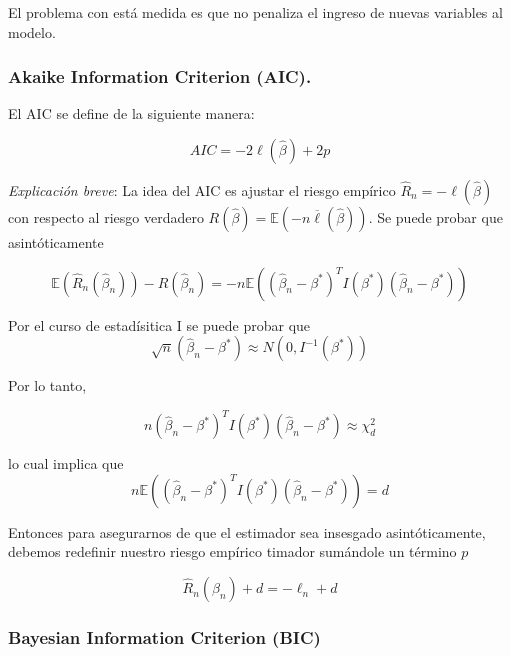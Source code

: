 \documentclass[
  12pt,
]{book}
\theoremstyle{definition}
\theoremstyle{definition}
\theoremstyle{definition}
\theoremstyle{definition}
\theoremstyle{remark}
\begin{document}
El problema con está medida es que no penaliza el ingreso de nuevas variables al modelo.

\hypertarget{akaike-information-criterion-aic.-1}{%
\subsubsection{Akaike Information Criterion (AIC).}\label{akaike-information-criterion-aic.-1}}

El AIC se define de la siguiente manera:

\[
AIC = -2\ell(\hat{\beta}) + 2p 
\]

\emph{Explicación breve}: La idea del AIC es ajustar el riesgo empírico \(\hat{R}_n = -\ell(\hat{\beta})\) con respecto al riesgo verdadero \(R(\hat{\beta}) = \mathbb{E}(-n\overline{\ell}(\hat{\beta}))\). Se puede probar que asintóticamente

\begin{equation*}
\mathbb{E}\left(\widehat{R}_{n}\left(\hat{\beta}_{n}\right)\right)-R\left(\widehat{\beta}_{n}\right)=-n \mathbb{E}\left(\left(\widehat{\beta}_{n}-\beta^{*}\right)^{T} I\left(\beta^{*}\right)\left(\widehat{\beta}_{n}-\beta^{*}\right)\right)
\end{equation*}

Por el curso de estadísitica I se puede probar que
\begin{equation*}
\sqrt{n}\left(\hat{\beta}_{n}-\beta^{*}\right) \approx N\left(0, I^{-1}\left(\beta^{*}\right)\right)
\end{equation*}

Por lo tanto,

\begin{equation*}
n\left(\widehat{\beta}_{n}-\beta^{*}\right)^{T} I\left(\beta^{*}\right)\left(\widehat{\beta}_{n}-\beta^{*}\right) \approx \chi_{d}^{2}
\end{equation*}

lo cual implica que
\begin{equation*}
n \mathbb{E}\left(\left(\widehat{\beta}_{n}-\beta^{*}\right)^{T} I\left(\beta^{*}\right)\left(\widehat{\beta}_{n}-\beta^{*}\right)\right)=d
\end{equation*}

Entonces para asegurarnos de que el estimador sea insesgado asintóticamente, debemos redefinir nuestro riesgo empírico timador sumándole un término \(p\)

\[\widehat{R}_{n}\left(\widehat{\beta}_{n}\right)+d=-\ell_{n}+d\]

\hypertarget{bayesian-information-criterion-bic}{%
\subsubsection{Bayesian Information Criterion (BIC)}\label{bayesian-information-criterion-bic}}
\end{document}

